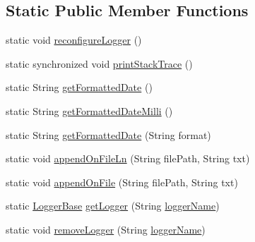 \subsection*{Static Public Member Functions}
\begin{DoxyCompactItemize}
\item 
static void \hyperlink{classit_1_1emarolab_1_1cagg_1_1debugging_1_1DebuggingText_a0e2c647d4a1d08dddcb92012fe7dbf96}{reconfigure\-Logger} ()
\item 
static synchronized void \hyperlink{classit_1_1emarolab_1_1cagg_1_1debugging_1_1DebuggingText_a5fe00fe913208f351fb3fb5d0e7127a9}{print\-Stack\-Trace} ()
\item 
static String \hyperlink{classit_1_1emarolab_1_1cagg_1_1debugging_1_1DebuggingText_a8f1b74b8facecd8d3d8e6af8f4fdc2f3}{get\-Formatted\-Date} ()
\item 
static String \hyperlink{classit_1_1emarolab_1_1cagg_1_1debugging_1_1DebuggingText_a5e04fdd2eba1a730c1b92ff3bab4caf3}{get\-Formatted\-Date\-Milli} ()
\item 
static String \hyperlink{classit_1_1emarolab_1_1cagg_1_1debugging_1_1DebuggingText_af38d51afccf59a8c3ccc8200c6450eb9}{get\-Formatted\-Date} (String format)
\item 
static void \hyperlink{classit_1_1emarolab_1_1cagg_1_1debugging_1_1DebuggingText_a2072bb771144fe4ee351b280b5cd1d1f}{append\-On\-File\-Ln} (String file\-Path, String txt)
\item 
static void \hyperlink{classit_1_1emarolab_1_1cagg_1_1debugging_1_1DebuggingText_ac66b9b01ad239da84666020251bc29a0}{append\-On\-File} (String file\-Path, String txt)
\item 
static \hyperlink{classit_1_1emarolab_1_1cagg_1_1debugging_1_1DebuggingText_1_1LoggerBase}{Logger\-Base} \hyperlink{classit_1_1emarolab_1_1cagg_1_1debugging_1_1DebuggingText_ad2a37c24601dc09d592411c66de38a06}{get\-Logger} (String \hyperlink{classit_1_1emarolab_1_1cagg_1_1debugging_1_1DebuggingText_afa1175bdb0c7a658affe0b25a8a924c3}{logger\-Name})
\item 
static void \hyperlink{classit_1_1emarolab_1_1cagg_1_1debugging_1_1DebuggingText_ae3361cef8e62e124b2890b968bbe1731}{remove\-Logger} (String \hyperlink{classit_1_1emarolab_1_1cagg_1_1debugging_1_1DebuggingText_afa1175bdb0c7a658affe0b25a8a924c3}{logger\-Name})
\end{DoxyCompactItemize}
